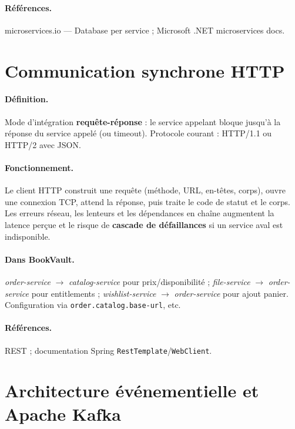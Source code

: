 \documentclass[12pt,a4paper]{report}
\begin{document}
\paragraph{Références.} microservices.io — Database per service ; Microsoft .NET microservices docs.\par


\section{Communication synchrone HTTP}

\paragraph{Définition.} Mode d'intégration \textbf{requête-réponse} : le service appelant bloque jusqu'à la réponse du service appelé (ou timeout). Protocole courant : HTTP/1.1 ou HTTP/2 avec JSON.\par

\paragraph{Fonctionnement.} Le client HTTP construit une requête (méthode, URL, en-têtes, corps), ouvre une connexion TCP, attend la réponse, puis traite le code de statut et le corps. Les erreurs réseau, les lenteurs et les dépendances en chaîne augmentent la latence perçue et le risque de \textbf{cascade de défaillances} si un service aval est indisponible.\par

\paragraph{Dans BookVault.} \textit{order-service} $\rightarrow$ \textit{catalog-service} pour prix/disponibilité ; \textit{file-service} $\rightarrow$ \textit{order-service} pour entitlements ; \textit{wishlist-service} $\rightarrow$ \textit{order-service} pour ajout panier. Configuration via \texttt{order.catalog.base-url}, etc.\par

\paragraph{Références.} REST ; documentation Spring \texttt{RestTemplate}/\texttt{WebClient}.\par


\section{Architecture événementielle et Apache Kafka}
\end{document}
